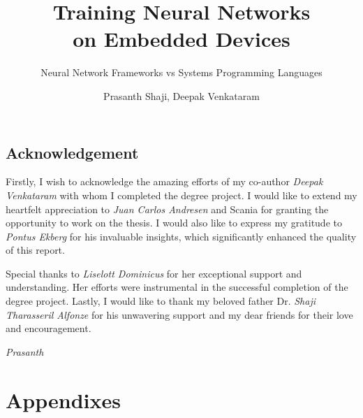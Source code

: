 \documentclass[a4paper]{UUThesisTemplate}
\author{Prasanth Shaji, Deepak Venkataram}
\title{Training Neural Networks \\ on Embedded Devices}
\subtitle{Neural Network Frameworks vs Systems Programming Languages}
\begin{document}


\frontmatter

	\chapter*{Acknowledgement}
	Firstly, I wish to acknowledge the amazing efforts of my co-author \textit{Deepak Venkataram} with whom I completed the degree project. I would like to extend my heartfelt appreciation to \textit{Juan Carlos Andresen} and Scania for granting the opportunity to work on the thesis. I would also like to express my gratitude to \textit{Pontus Ekberg} for his invaluable insights, which significantly enhanced the quality of this report.

	Special thanks to \textit{Liselott Dominicus} for her exceptional support and understanding. Her efforts were instrumental in the successful completion of the degree project. Lastly, I would like to thank my beloved father Dr. \textit{Shaji Tharasseril Alfonze} for his unwavering support and my dear friends for their love and encouragement.

	\hfill \textit{Prasanth}


	\begingroup
		\tableofcontents
	\endgroup


\mainmatter
	
	
	

\backmatter
	\nocite{*} %
	
	

	\part{Appendixes}

	
	
	
\end{document}
